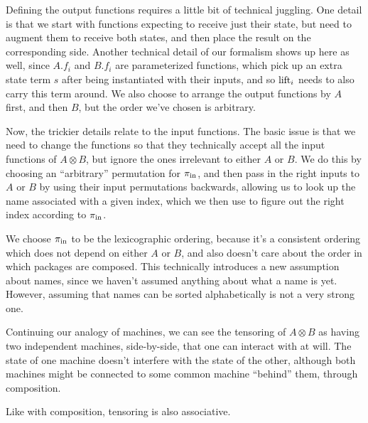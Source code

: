 Defining the output functions requires a little bit of technical juggling.
One detail is that we start with functions expecting to receive
just their state, but need to augment them to receive both states,
and then place the result on the corresponding side.
Another technical detail of our formalism shows up here as well,
since $A.f_i$ and $B.f_i$ are parameterized functions, which pick up
an extra state term $s$ after being instantiated with their inputs,
and so $\text{lift}_i$ needs to also carry this term around.
We also choose to arrange the output functions by $A$ first,
and then $B$, but the order we've chosen is arbitrary.

Now, the trickier details relate to the input functions.
The basic issue is that we need to change the functions so that
they technically accept all the input functions of $A \otimes B$,
but ignore the ones irrelevant to either $A$ or $B$.
We do this by choosing an ``arbitrary'' permutation for $\pi_{\text{in}}$,
and then pass in the right inputs to $A$ or $B$ by using
their input permutations backwards, allowing us to look up the name
associated with a given index,
which we then use to figure out the right index according to $\pi_{\text{in}}$.

We choose $\pi_{\text{in}}$ to be the lexicographic ordering,
because it's a consistent ordering which does not depend
on either $A$ or $B$, and also doesn't care about the order in which
packages are composed.
This technically introduces a new assumption about names, since we
haven't assumed anything about what a name is yet.
However, assuming that names can be sorted alphabetically is not
a very strong one.

Continuing our analogy of machines, we can see the tensoring of $A \otimes B$
as having two independent machines, side-by-side, that one can interact
with at will.
The state of one machine doesn't interfere with the state of the other,
although both machines might be connected to some common machine ``behind''
them, through composition.

Like with composition, tensoring is also associative.

